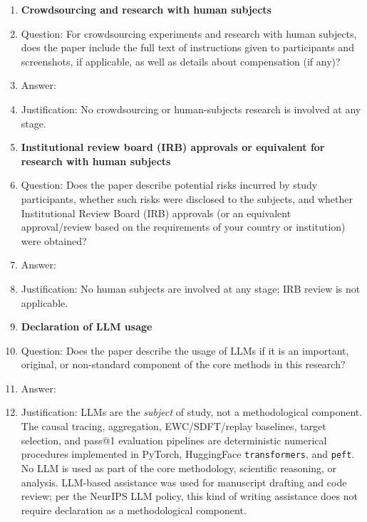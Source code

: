 \begin{enumerate}
\item {\bf Crowdsourcing and research with human subjects}
    \item[] Question: For crowdsourcing experiments and research with human subjects, does the paper include the full text of instructions given to participants and screenshots, if applicable, as well as details about compensation (if any)?
    \item[] Answer: \answerNA{}
    \item[] Justification: No crowdsourcing or human-subjects research is involved at any stage.

\item {\bf Institutional review board (IRB) approvals or equivalent for research with human subjects}
    \item[] Question: Does the paper describe potential risks incurred by study participants, whether such risks were disclosed to the subjects, and whether Institutional Review Board (IRB) approvals (or an equivalent approval/review based on the requirements of your country or institution) were obtained?
    \item[] Answer: \answerNA{}
    \item[] Justification: No human subjects are involved at any stage; IRB review is not applicable.

\item {\bf Declaration of LLM usage}
    \item[] Question: Does the paper describe the usage of LLMs if it is an important, original, or non-standard component of the core methods in this research?
    \item[] Answer: \answerNA{}
    \item[] Justification: LLMs are the \emph{subject} of study, not a methodological component. The causal tracing, \fvs{} aggregation, EWC/SDFT/replay baselines, \tglora{} target selection, and pass@1 evaluation pipelines are deterministic numerical procedures implemented in PyTorch, HuggingFace \texttt{transformers}, and \texttt{peft}. No LLM is used as part of the core methodology, scientific reasoning, or analysis. LLM-based assistance was used for manuscript drafting and code review; per the NeurIPS LLM policy, this kind of writing assistance does not require declaration as a methodological component.

\end{enumerate}
